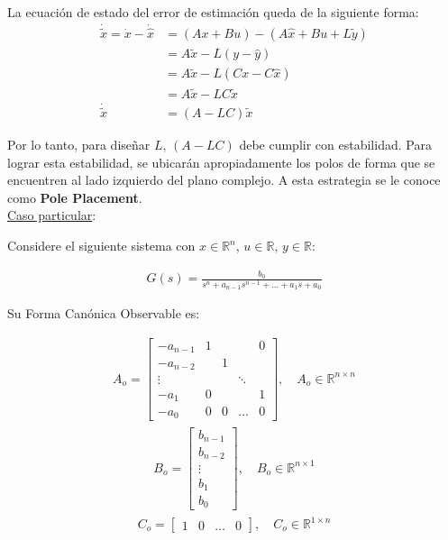 La ecuación de estado del error de estimación queda de la siguiente forma:
\begin{align*}
    \dot{\tilde{x}}=\dot{x}-\dot{\hat{x}} &= (Ax+Bu)-(A\hat{x}+Bu+L\tilde{y})\\
    &= A\tilde{x}-L(y-\hat{y})\\
    &= A\tilde{x}-L(Cx-C\hat{x})\\
    &= A\tilde{x}-LC\tilde{x}\\
    \dot{\tilde{x}} &= (A-LC)\tilde{x}
\end{align*}

Por lo tanto, para diseñar $L$, $(A-LC)$ debe cumplir con estabilidad. Para lograr esta estabilidad, se ubicarán apropiadamente los polos de forma que se encuentren al lado izquierdo del plano complejo. A esta estrategia se le conoce como \textbf{Pole Placement}. \\

\underline{Caso particular}: 

Considere el siguiente sistema con $x\in\mathbb{R}^n$, $u\in\mathbb{R}$, $y\in\mathbb{R}$: 

\begin{align*}
    G(s) = \frac{b_0}{s^n+a_{n-1}s^{n-1}+...+a_1s+a_0}
\end{align*}

Su Forma Canónica Observable es: 

\begin{align*}
{A_o}=\left[
    \begin{array}{c|cccc}
     -a_{n-1} & 1 & & & 0 \\ 
     -a_{n-2} & & 1 & & \\
     \vdots   & & & \ddots & \\
     -a_1     & 0 & & & 1 \\ \hline
     -a_0     & 0 & 0 & \dots & 0   
    \end{array}\right], \quad {A_o}\in \mathbb{R}^{n\times n}
\end{align*}
\begin{align*}
{B_o}=\left[
    \begin{array}{c}
     b_{n-1} \\
     b_{n-2}\\
    \vdots\\
     b_1 \\ \hline
     b_0
    \end{array}\right], \quad {B_o}\in \mathbb{R}^{n\times 1}
\end{align*}
\begin{align*}
{C_o}=\left[
    \begin{array}{c|ccc}
     1 & 0 & \dots & 0
    \end{array}\right], \quad {C}_o\in \mathbb{R}^{1\times n}
\end{align*}

